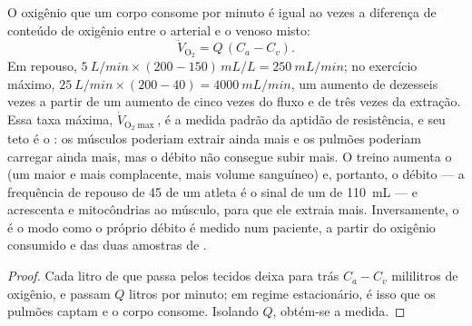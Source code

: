 \begin{theorem}\label{thm:b2:blood-pressure:fick}
O oxigênio que um corpo consome por minuto é igual ao 
vezes a diferença de conteúdo de oxigênio entre o  arterial e o
 venoso misto:
\[
\dot V_{\mathrm{O_2}} = Q\,(C_a - C_v).
\]
Em repouso, $\qty{5}{L/min}\times(200 - 150)\,\unit{mL/L} = \qty{250}{mL/min}$;
no exercício máximo, $\qty{25}{L/min}\times(200 - 40) =
\qty{4000}{mL/min}$, um aumento de dezesseis vezes a partir de um
aumento de cinco vezes do fluxo e de três vezes da extração. Essa taxa
máxima, $\dot V_{\mathrm{O_2}\max}$, é a medida padrão da aptidão de
resistência, e seu teto é o : os músculos poderiam extrair ainda
mais e os pulmões poderiam carregar ainda mais, mas o débito não
consegue subir mais. O treino aumenta o  (um 
maior e mais complacente, mais volume sanguíneo) e, portanto, o débito
--- a frequência de repouso de 45 de um atleta é o sinal de um  de \qty{110}{mL} --- e acrescenta  e mitocôndrias ao
músculo, para que ele extraia mais. Inversamente, o  é
o modo como o próprio débito é medido num paciente, a partir do
oxigênio consumido e das duas amostras de .
\end{theorem}
\begin{proof}
Cada litro de  que passa pelos tecidos deixa para trás
$C_a - C_v$ mililitros de oxigênio, e passam $Q$ litros por minuto; em
regime estacionário, é isso que os pulmões captam e o corpo consome.
Isolando $Q$, obtém-se a medida.
\end{proof}

